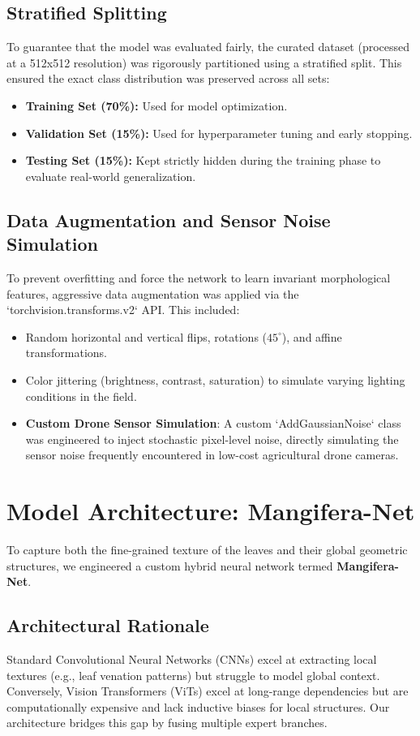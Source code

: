 \documentclass[12pt,a4paper]{article}
\begin{document}
\subsection{Stratified Splitting}
To guarantee that the model was evaluated fairly, the curated dataset (processed at a 512x512 resolution) was rigorously partitioned using a stratified split. This ensured the exact class distribution was preserved across all sets:
\begin{itemize}
    \item \textbf{Training Set (70\%):} Used for model optimization.
    \item \textbf{Validation Set (15\%):} Used for hyperparameter tuning and early stopping.
    \item \textbf{Testing Set (15\%):} Kept strictly hidden during the training phase to evaluate real-world generalization.
\end{itemize}

\subsection{Data Augmentation and Sensor Noise Simulation}
To prevent overfitting and force the network to learn invariant morphological features, aggressive data augmentation was applied via the `torchvision.transforms.v2` API. This included:
\begin{itemize}
    \item Random horizontal and vertical flips, rotations ($45^\circ$), and affine transformations.
    \item Color jittering (brightness, contrast, saturation) to simulate varying lighting conditions in the field.
    \item \textbf{Custom Drone Sensor Simulation}: A custom `AddGaussianNoise` class was engineered to inject stochastic pixel-level noise, directly simulating the sensor noise frequently encountered in low-cost agricultural drone cameras.
\end{itemize}

\section{Model Architecture: Mangifera-Net}
To capture both the fine-grained texture of the leaves and their global geometric structures, we engineered a custom hybrid neural network termed \textbf{Mangifera-Net}. 

\subsection{Architectural Rationale}
Standard Convolutional Neural Networks (CNNs) excel at extracting local textures (e.g., leaf venation patterns) but struggle to model global context. Conversely, Vision Transformers (ViTs) excel at long-range dependencies but are computationally expensive and lack inductive biases for local structures. Our architecture bridges this gap by fusing multiple expert branches.
\end{document}
